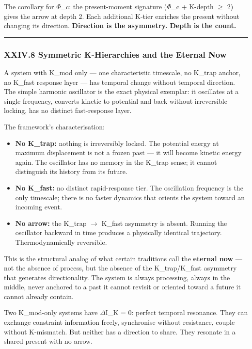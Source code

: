 \documentclass[12pt,a4paper]{article}
\begin{document}
The corollary for $\Phi$\_c: the present-moment signature ($\Phi$\_c + K-depth $\geq$ 2) gives the arrow at depth 2. Each additional K-tier enriches the present without changing its direction. \textbf{Direction is the asymmetry. Depth is the count.}

\begin{center}
\rule{0.5\textwidth}{0.4pt}
\end{center}

\subsubsection{XXIV.8 Symmetric K-Hierarchies and the Eternal Now}

A system with K\_mod only --- one characteristic timescale, no K\_trap anchor, no K\_fast response layer --- has temporal change without temporal direction. The simple harmonic oscillator is the exact physical exemplar: it oscillates at a single frequency, converts kinetic to potential and back without irreversible locking, has no distinct fast-response layer.

The framework's characterisation:

\begin{itemize}
    \item \textbf{No K\_trap:} nothing is irreversibly locked. The potential energy at maximum displacement is not a frozen past --- it will become kinetic energy again. The oscillator has no memory in the K\_trap sense; it cannot distinguish its history from its future.
    \item \textbf{No K\_fast:} no distinct rapid-response tier. The oscillation frequency is the only timescale; there is no faster dynamics that orients the system toward an incoming event.
    \item \textbf{No arrow:} the K\_trap $\rightarrow$ K\_fast asymmetry is absent. Running the oscillator backward in time produces a physically identical trajectory. Thermodynamically reversible.
\end{itemize}

This is the structural analog of what certain traditions call the \textbf{eternal now} --- not the absence of process, but the absence of the K\_trap/K\_fast asymmetry that generates directionality. The system is always processing, always in the middle, never anchored to a past it cannot revisit or oriented toward a future it cannot already contain.

Two K\_mod-only systems have $\Delta$I\_K = 0: perfect temporal resonance. They can exchange constraint information freely, synchronise without resistance, couple without K-mismatch. But neither has a direction to share. They resonate in a shared present with no arrow.
\end{document}
